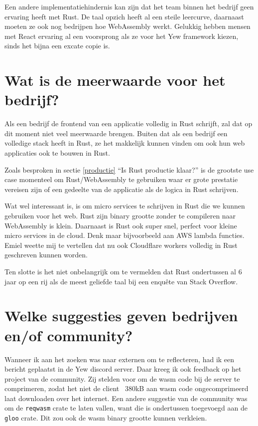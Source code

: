 Een andere implementatiehindernis kan zijn dat het team binnen het bedrijf geen ervaring heeft met
Rust. De taal opzich heeft al een steile leercurve, daarnaast moeten ze ook nog bedrijpen hoe
WebAssembly werkt. Gelukkig hebben mensen met React ervaring al een voorsprong als ze voor het Yew
framework kiezen, sinds het bijna een excate copie is.

\section{Wat is de meerwaarde voor het bedrijf?}

Als een bedrijf de frontend van een applicatie volledig in Rust schrijft, zal dat op dit moment niet
veel meerwaarde brengen. Buiten dat als een bedrijf een volledige stack heeft in Rust, ze het
makkelijk kunnen vinden om ook hun web applicaties ook te bouwen in Rust. 

Zoals besproken in sectie \ref{productie} \enquote{Is Rust productie klaar?} is de grootste use case
momenteel om Rust/WebAssembly te gebruiken waar er grote prestatie vereisen zijn of een gedeelte van
de applicatie als de logica in Rust schrijven.

Wat wel interessant is, is om micro services te schrijven in Rust die we kunnen gebruiken voor het
web. Rust zijn binary grootte zonder te compileren naar WebAssembly is klein. Daarnaast is Rust ook
super snel, perfect voor kleine micro services in de cloud. Denk maar bijvoorbeeld aan AWS lambda
functies. Emiel weette mij te vertellen dat nu ook Cloudflare workers volledig in Rust geschreven
kunnen worden. \cite{cloudflare_workers}

Ten slotte is het niet onbelangrijk om te vermelden dat Rust ondertussen al 6 jaar op een rij als de meest
geliefde taal bij een enquête van Stack Overflow. \cite{so_enquete} 

\section{Welke suggesties geven bedrijven en/of community?}

Wanneer ik aan het zoeken was naar externen om te reflecteren, had ik een bericht geplaatst in de
Yew discord server. Daar kreeg ik ook feedback op het project van de community. Zij stelden voor om
de wasm code bij de server te comprimeren, zodat het niet de client ~380kB aan wasm code
ongecomprimeerd laat downloaden over het internet. Een andere suggestie van de community was om de
\texttt{reqwasm} crate te laten vallen, want die is ondertussen toegevoegd aan de
\texttt{gloo} crate. Dit zou ook de wasm binary grootte kunnen verkleien.

